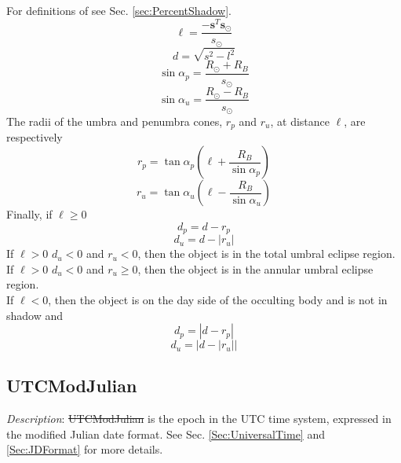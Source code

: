 For definitions of see Sec. \ref{sec:PercentShadow}.
%
\begin{equation}
    \ell = \frac{-\mathbf{s}^T\mathbf{s}_\odot}{s_\odot}
\end{equation}
%
\begin{equation}
    d = \sqrt{ s^2 - l^2 }
\end{equation}
%
\begin{equation}
     \sin{\alpha_p} = \frac{R_\odot + R_B}{s_\odot}
\end{equation}
%
\begin{equation}
     \sin{\alpha_u} = \frac{R_\odot - R_B}{s_\odot}
\end{equation}
%
The radii of the umbra and penumbra cones, $r_p$ and $r_u$, at
distance $\ell$, are respectively
%
\begin{equation}
     r_p = \tan{\alpha_p}\left( \ell +
     \frac{R_B}{\sin{\alpha_p}}\right)
\end{equation}
%
\begin{equation}
     r_u = \tan{\alpha_u}\left( \ell -
     \frac{R_B}{\sin{\alpha_u}}\right)
\end{equation}
%
Finally, if $\ell \geq 0$
%
\begin{equation}
     d_p = d - r_p
\end{equation}
%
\begin{equation}
     d_u = d - |r_u|
\end{equation}
%
If $\ell > 0$ $d_u < 0$ and $r_u < 0$, then the object is in the
total umbral
eclipse region.\\
%
If $\ell > 0$ $d_u < 0$ and $r_u \geq 0$, then the object is in the
annular umbral eclipse region.\\
%
If $\ell < 0$, then the object is on the day side of the occulting
body and is not in shadow and
%
\begin{equation}
     d_p = |d - r_p|
\end{equation}
%
\begin{equation}
     d_u = |d - |r_u||
\end{equation}
%

\subsection{UTCModJulian} \label{Sec:UTCModJulian}

\noindent \textit{Description}: \st{UTCModJulian} is the epoch in
the UTC time system, expressed in the modified Julian date format.
See Sec. \ref{Sec:UniversalTime} and \ref{Sec:JDFormat} for more
details.

